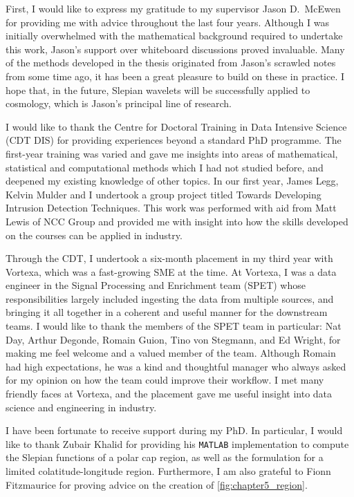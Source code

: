 \begin{acknowledgements}
	First, I would like to express my gratitude to my supervisor Jason D.~McEwen for providing me with advice throughout the last four years.
	Although I was initially overwhelmed with the mathematical background required to undertake this work, Jason's support over whiteboard discussions proved invaluable.
	Many of the methods developed in the thesis originated from Jason's scrawled notes from some time ago, it has been a great pleasure to build on these in practice.
	I hope that, in the future, Slepian wavelets will be successfully applied to cosmology, which is Jason's principal line of research.

	I would like to thank the Centre for Doctoral Training in Data Intensive Science (CDT DIS) for providing experiences beyond a standard PhD programme.
	The first-year training was varied and gave me insights into areas of mathematical, statistical and computational methods which I had not studied before, and deepened my existing knowledge of other topics.
	In our first year, James Legg, Kelvin Mulder and I undertook a group project titled Towards Developing Intrusion Detection Techniques.
	This work was performed with aid from Matt Lewis of NCC Group and provided me with insight into how the skills developed on the courses can be applied in industry.

	Through the CDT, I undertook a six-month placement in my third year with Vortexa, which was a fast-growing SME at the time. %
	At Vortexa, I was a data engineer in the Signal Processing and Enrichment team (SPET) whose responsibilities largely included ingesting the data from multiple sources, and bringing it all together in a coherent and useful manner for the downstream teams.
	I would like to thank the members of the SPET team in particular: Nat Day, Arthur Degonde, Romain Guion, Tino von Stegmann, and Ed Wright, for making me feel welcome and a valued member of the team.
	Although Romain had high expectations, he was a kind and thoughtful manager who always asked for my opinion on how the team could improve their workflow.
	I met many friendly faces at Vortexa, and the placement gave me useful insight into data science and engineering in industry.

	I have been fortunate to receive support during my PhD.
	In particular, I would like to thank Zubair Khalid for providing his \texttt{MATLAB} implementation to compute the Slepian functions of a polar cap region, as well as the formulation for a limited colatitude-longitude region.
	Furthermore, I am also grateful to Fionn Fitzmaurice for proving advice on the creation of \cref{fig:chapter5_region}.


\end{acknowledgements}
